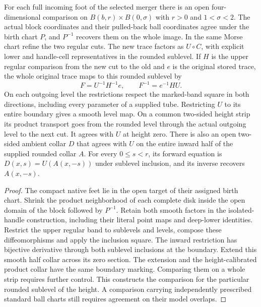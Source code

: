 \begin{theorem}
\label{thm:ed03-original-rounded-trace}
\leanok
For each full incoming foot of the selected merger there is an open
four-dimensional comparison on $B(b,r)\times B(0,\sigma)$ with $r>0$ and
$1<\sigma<2$. The actual block coordinates and their pulled-back ball
coordinates agree under the birth chart $P$, and $P^{-1}$ recovers them
on the whole image. In the same Morse chart refine the two regular cuts.
The new trace factors as $U\circ C$, with explicit lower and handle-cell
representatives in the rounded sublevel. If $H$ is the upper regular
comparison from the new cut to the old and $e$ is the original stored
trace, the whole original trace maps to this rounded sublevel by
\[
 F=U^{-1}H^{-1}e,\qquad F^{-1}=e^{-1}HU .
\]
On each outgoing level the restrictions respect the marked-band square
in both directions, including every parameter of a supplied tube. Restricting $U$ to its entire boundary gives a smooth level map. On a common two-sided height strip its product transport goes from the rounded level through the actual outgoing level to the next cut. It agrees with $U$ at height zero. There is also an open two-sided ambient collar $D$ that agrees with $U$ on the entire inward half of the supplied rounded collar $A$. For every $0\le s<r$, its forward equation is $D(x,s)=U(A(x,-s))$ under sublevel inclusion, and its inverse recovers $A(x,-s)$.
\end{theorem}
\begin{proof}
\leanok
The compact native feet lie in the open target of their assigned birth
chart. Shrink the product neighborhood of each complete disk inside the
open domain of the block followed by $P^{-1}$. Retain both smooth factors
in the isolated-handle construction, including their literal point maps
and deep-lower identities. Restrict the upper regular band to sublevels
and levels, compose these diffeomorphisms and apply the inclusion square.
The inward restriction has bijective derivative through both sublevel inclusions at the boundary. Extend this smooth half collar across its zero section. The extension and the height-calibrated product collar have the same boundary marking. Comparing them on a whole strip requires further control.
This constructs the comparison for the particular rounded sublevel of
the height. A comparison carrying independently prescribed standard
ball charts still requires agreement on their model overlaps.
\end{proof}

